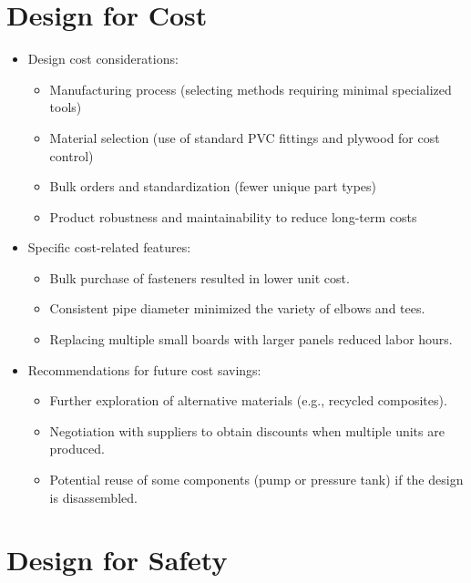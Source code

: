 \documentclass[12pt]{article}
\begin{document}
\section{Design for Cost}
\begin{itemize}[leftmargin=1.5cm]
    \item Design cost considerations:
    \begin{itemize}
        \item Manufacturing process (selecting methods requiring minimal specialized tools)
        \item Material selection (use of standard PVC fittings and plywood for cost control)
        \item Bulk orders and standardization (fewer unique part types)
        \item Product robustness and maintainability to reduce long-term costs
    \end{itemize}

    \item Specific cost-related features:
    \begin{itemize}
        \item Bulk purchase of fasteners resulted in lower unit cost.
        \item Consistent pipe diameter minimized the variety of elbows and tees.
        \item Replacing multiple small boards with larger panels reduced labor hours.
    \end{itemize}

    \item Recommendations for future cost savings:
    \begin{itemize}
        \item Further exploration of alternative materials (e.g., recycled composites).
        \item Negotiation with suppliers to obtain discounts when multiple units are produced.
        \item Potential reuse of some components (pump or pressure tank) if the design is disassembled.
    \end{itemize}
\end{itemize}


\section{Design for Safety}
\end{document}
